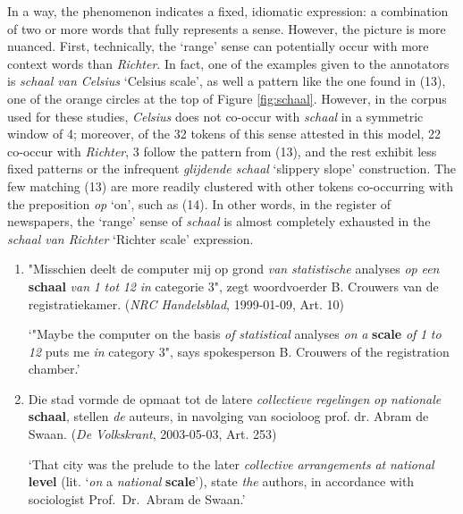 \documentclass[
]{book}
\begin{document}
In a way, the phenomenon indicates a fixed, idiomatic expression: a combination of two or more words that fully represents a sense. However, the picture is more nuanced.
First, technically, the `range' sense can potentially occur with more context words than \emph{Richter}. In fact, one of the examples given to the annotators is \emph{schaal van Celsius} `Celsius scale', as well a pattern like the one found in (13), one of the orange circles at the top of Figure \ref{fig:schaal}. However, in the corpus used for these studies, \emph{Celsius} does not co-occur with \emph{schaal} in a symmetric window of 4; moreover, of the 32 tokens of this sense attested in this model, 22 co-occur with \emph{Richter}, 3 follow the pattern from (13), and the rest exhibit less fixed patterns or the infrequent \emph{glijdende schaal} `slippery slope' construction. The few matching (13) are more readily clustered with other tokens co-occurring with the preposition \emph{op} `on', such as (14). In other words, in the register of newspapers, the `range' sense of \emph{schaal} is almost completely exhausted in the \emph{schaal van Richter} `Richter scale' expression.

\begin{enumerate}
\def\labelenumi{(\arabic{enumi})}
\setcounter{enumi}{12}
\item
  "Misschien deelt de computer mij op grond \emph{van} \emph{statistische} analyses \emph{op} \emph{een} \textbf{schaal} \emph{van} \emph{1} \emph{tot} \emph{12} \emph{in} categorie 3", zegt woordvoerder B. Crouwers van de registratiekamer. (\emph{NRC Handelsblad}, 1999-01-09, Art. 10)

  `"Maybe the computer on the basis \emph{of} \emph{statistical} analyses \emph{on} \emph{a} \textbf{scale} \emph{of} \emph{1} \emph{to} \emph{12} puts me \emph{in} category 3", says spokesperson B. Crouwers of the registration chamber.'
\item
  Die stad vormde de opmaat tot de latere \emph{collectieve} \emph{regelingen} \emph{op} \emph{nationale} \textbf{schaal}, stellen \emph{de} auteurs, in navolging van socioloog prof. dr. Abram de Swaan. (\emph{De Volkskrant}, 2003-05-03, Art. 253)

  `That city was the prelude to the later \emph{collective} \emph{arrangements} \emph{at} \emph{national} \textbf{level} (lit. `\emph{on} a \emph{national} \textbf{scale}'), state \emph{the} authors, in accordance with sociologist Prof.~Dr.~Abram de Swaan.'
\end{enumerate}
\end{document}
